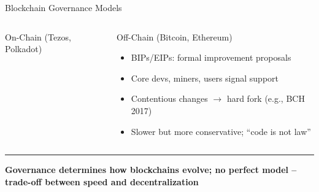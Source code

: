 \documentclass[8pt,aspectratio=169]{beamer}
\newcommand{\bottomnote}[1]{\vfill\vspace{-2mm}\textcolor{mllavender2}{\rule{\textwidth}{0.4pt}}\vspace{1mm}\footnotesize\textbf{#1}}
\begin{document}
\begin{frame}{Blockchain Governance Models}
\begin{columns}
\begin{block}{On-Chain (Tezos, Polkadot)}
\end{block}
\begin{block}{Off-Chain (Bitcoin, Ethereum)}
\begin{itemize}\small
  \item BIPs/EIPs: formal improvement proposals
  \item Core devs, miners, users signal support
  \item Contentious changes $\to$ hard fork (e.g., BCH 2017)
  \item Slower but more conservative; ``code is not law''
\end{itemize}
\end{block}
\end{columns}
\bottomnote{Governance determines how blockchains evolve; no perfect model -- trade-off between speed and decentralization}
\end{frame}
\end{document}
